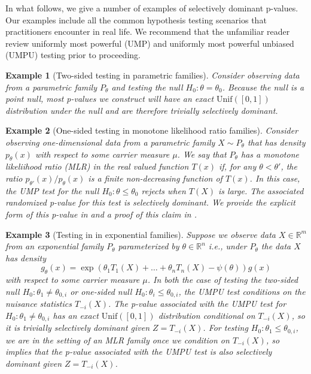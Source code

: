 \documentclass{article}
\newtheorem{example}{Example}
\newcommand{\R}{\mathbb{R}}
\begin{document}
In what follows, we give a number of examples of selectively dominant p-values. Our examples include all the common hypothesis testing scenarios that practitioners encounter in real life. We recommend that the unfamiliar reader review uniformly most powerful (UMP) and uniformly most powerful unbiased (UMPU) testing \cite[Chapter 3 and Chapter 4]{Lehmann} prior to proceeding.

\begin{example}[Two-sided testing in parametric families]
\label{exm:two-sided}
Consider observing data from a parametric family $P_{\theta}$ and testing the null $H_0 : \theta = \theta_0$. Because the null is a point null, most p-values we construct will have an exact $\text{Unif}([0, 1])$ distribution under the null and are therefore trivially selectively dominant. 
\end{example}

\begin{example}[One-sided testing in monotone likelihood ratio families]
\label{exm:mlr}
Consider observing one-dimensional data from a parametric family $X \sim P_{\theta}$ that has density $p_{\theta}(x)$ with respect to some carrier measure $\mu$. We say that $P_{\theta}$ has a monotone likeliihood ratio (MLR) in the real valued function $T(x)$ if, for any $\theta < \theta'$, the ratio $p_{\theta'}(x)/p_{\theta}(x)$ is a finite non-decreasing function of $T(x)$. In this case, the UMP test for the null $H_0: \theta \leq \theta_0$ rejects when $T(X)$ is large. The associated randomized p-value for this test is selectively dominant. We provide the explicit form of this p-value in  and a proof of this claim in .
\end{example}

\begin{example}[Testing in in exponential families]
\label{exm:exp_fam}
Suppose we observe data $X \in \R^m$ from an exponential family $P_{\theta}$ parameterized by $\theta \in \R^n$ i.e., under $P_{\theta}$ the data $X$ has density  
\begin{equation*}
    g_{\theta}(x) = \exp( \theta_1 T_1(X) + \dots + \theta_n T_n(X) - \psi(\theta) ) g(x) 
\end{equation*}
with respect to some carrier measure $\mu$. In both the case of testing the two-sided null $H_0: \theta_1 \neq \theta_{0, i}$ or one-sided null $H_0: \theta_i \leq \theta_{0, i}$, the UMPU test conditions on the nuisance statistics $T_{-i}(X)$. The p-value associated with the UMPU test for $H_0: \theta_1 \neq \theta_{0, i}$ has an exact $\text{Unif}([0, 1])$ distribution conditional on $T_{-i}(X)$, so it is trivially selectively dominant given $Z = T_{-i}(X)$. For testing $H_0: \theta_1 \leq \theta_{0, i}$, we are in the setting of an MLR family once we condition on $T_{-i}(X)$, so  implies that the p-value associated with the UMPU test is also selectively dominant given $Z = T_{-i}(X)$.
\end{example}
\end{document}

